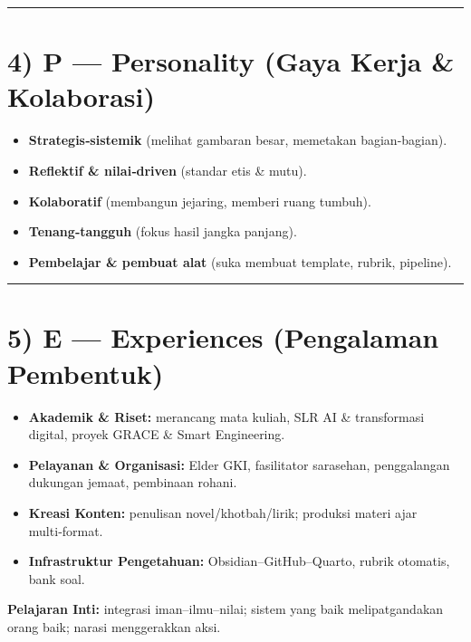 \documentclass[
  letterpaper,
  DIV=11,
  numbers=noendperiod]{scrreprt}
\providecommand{\tightlist}{%
  \setlength{\itemsep}{0pt}\setlength{\parskip}{0pt}}
\begin{document}
\begin{center}\rule{0.5\linewidth}{0.5pt}\end{center}

\section{4) P --- Personality (Gaya Kerja \&
Kolaborasi)}\label{p-personality-gaya-kerja-kolaborasi}

\begin{itemize}
\tightlist
\item
  \textbf{Strategis‑sistemik} (melihat gambaran besar, memetakan
  bagian-bagian).
\item
  \textbf{Reflektif \& nilai‑driven} (standar etis \& mutu).
\item
  \textbf{Kolaboratif} (membangun jejaring, memberi ruang tumbuh).
\item
  \textbf{Tenang‑tangguh} (fokus hasil jangka panjang).
\item
  \textbf{Pembelajar \& pembuat alat} (suka membuat template, rubrik,
  pipeline).
\end{itemize}

\begin{center}\rule{0.5\linewidth}{0.5pt}\end{center}

\section{5) E --- Experiences (Pengalaman
Pembentuk)}\label{e-experiences-pengalaman-pembentuk}

\begin{itemize}
\tightlist
\item
  \textbf{Akademik \& Riset:} merancang mata kuliah, SLR AI \&
  transformasi digital, proyek GRACE \& Smart Engineering.
\item
  \textbf{Pelayanan \& Organisasi:} Elder GKI, fasilitator sarasehan,
  penggalangan dukungan jemaat, pembinaan rohani.
\item
  \textbf{Kreasi Konten:} penulisan novel/khotbah/lirik; produksi materi
  ajar multi‑format.
\item
  \textbf{Infrastruktur Pengetahuan:} Obsidian--GitHub--Quarto, rubrik
  otomatis, bank soal.
\end{itemize}

\textbf{Pelajaran Inti:} integrasi iman--ilmu--nilai; sistem yang baik
melipatgandakan orang baik; narasi menggerakkan aksi.
\end{document}
